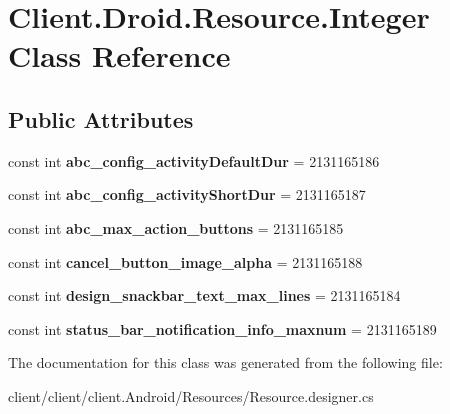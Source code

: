 \hypertarget{classClient_1_1Droid_1_1Resource_1_1Integer}{}\section{Client.\+Droid.\+Resource.\+Integer Class Reference}
\label{classClient_1_1Droid_1_1Resource_1_1Integer}
\subsection*{Public Attributes}
\begin{DoxyCompactItemize}
\item 
\hypertarget{classClient_1_1Droid_1_1Resource_1_1Integer_aca3ab1f6217c1fcec1206b1c4129e98f}{}const int {\bfseries abc\+\_\+config\+\_\+activity\+Default\+Dur} = 2131165186\label{classClient_1_1Droid_1_1Resource_1_1Integer_aca3ab1f6217c1fcec1206b1c4129e98f}

\item 
\hypertarget{classClient_1_1Droid_1_1Resource_1_1Integer_ad38d619e6a8caf8c4bdd613d3a816568}{}const int {\bfseries abc\+\_\+config\+\_\+activity\+Short\+Dur} = 2131165187\label{classClient_1_1Droid_1_1Resource_1_1Integer_ad38d619e6a8caf8c4bdd613d3a816568}

\item 
\hypertarget{classClient_1_1Droid_1_1Resource_1_1Integer_a47d479cc70e3b11f25e4739f74fc8280}{}const int {\bfseries abc\+\_\+max\+\_\+action\+\_\+buttons} = 2131165185\label{classClient_1_1Droid_1_1Resource_1_1Integer_a47d479cc70e3b11f25e4739f74fc8280}

\item 
\hypertarget{classClient_1_1Droid_1_1Resource_1_1Integer_a6ab4804a9563317c4fb1b29044703db8}{}const int {\bfseries cancel\+\_\+button\+\_\+image\+\_\+alpha} = 2131165188\label{classClient_1_1Droid_1_1Resource_1_1Integer_a6ab4804a9563317c4fb1b29044703db8}

\item 
\hypertarget{classClient_1_1Droid_1_1Resource_1_1Integer_a4f9685316c1308f84d43ef1cc521a3e4}{}const int {\bfseries design\+\_\+snackbar\+\_\+text\+\_\+max\+\_\+lines} = 2131165184\label{classClient_1_1Droid_1_1Resource_1_1Integer_a4f9685316c1308f84d43ef1cc521a3e4}

\item 
\hypertarget{classClient_1_1Droid_1_1Resource_1_1Integer_ab3e84e431812aa217726c9ac079b148d}{}const int {\bfseries status\+\_\+bar\+\_\+notification\+\_\+info\+\_\+maxnum} = 2131165189\label{classClient_1_1Droid_1_1Resource_1_1Integer_ab3e84e431812aa217726c9ac079b148d}

\end{DoxyCompactItemize}


The documentation for this class was generated from the following file\+:\begin{DoxyCompactItemize}
\item 
client/client/client.\+Android/\+Resources/Resource.\+designer.\+cs\end{DoxyCompactItemize}
